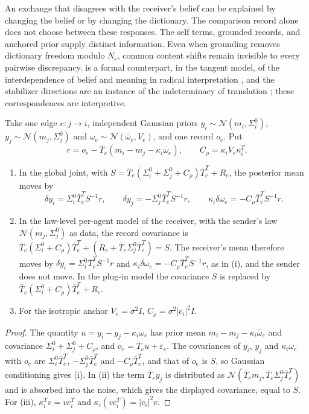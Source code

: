 An exchange that disagrees with the receiver's belief can be explained by changing the belief or by changing the dictionary. The comparison record alone does not choose between these responses. The self terms, grounded records, and anchored prior supply distinct information. Even when grounding removes dictionary freedom modulo $N_e$, common content shifts remain invisible to every pairwise discrepancy.  is a formal counterpart, in the tangent model, of the interdependence of belief and meaning in radical interpretation \citep{Davidson1973,Davidson1974}, and the stabilizer directions are an instance of the indeterminacy of translation \citep{Quine1960}; these correspondences are interpretive.

Take one edge $e:j\to i$, independent Gaussian priors $y_i\sim\mathcal N(m_i,\Sigma_i^0)$, $y_j\sim\mathcal N(m_j,\Sigma_j^0)$ and $\omega_e\sim\mathcal N(\bar\omega_e,V_e)$, and one record $o_e$. Put
\begin{equation}
r=o_e-\bar T_e(m_i-m_j-\kappa_i\bar\omega_e),\qquad C_\rho=\kappa_iV_e\kappa_i^T.
\label{it2:split-notation}
\end{equation}
\begin{enumerate}
\item[(i)] In the global joint, with $S=\bar T_e(\Sigma_i^0+\Sigma_j^0+C_\rho)\bar T_e^T+R_e$, the posterior mean moves by
\begin{equation}
\delta y_i=\Sigma_i^0\bar T_e^TS^{-1}r,\qquad
\delta y_j=-\Sigma_j^0\bar T_e^TS^{-1}r,\qquad
\kappa_i\delta\omega_e=-C_\rho\bar T_e^TS^{-1}r.
\label{it2:split-global}
\end{equation}
\item[(ii)] In the law-level per-agent model of the receiver, with the sender's law $\mathcal N(m_j,\Sigma_j^0)$ as data, the record covariance is $\bar T_e(\Sigma_i^0+C_\rho)\bar T_e^T+(R_e+\bar T_e\Sigma_j^0\bar T_e^T)=S$. The receiver's mean therefore moves by $\delta y_i=\Sigma_i^0\bar T_e^TS^{-1}r$ and $\kappa_i\delta\omega_e=-C_\rho\bar T_e^TS^{-1}r$, as in (i), and the sender does not move. In the plug-in model the covariance $S$ is replaced by $\bar T_e(\Sigma_i^0+C_\rho)\bar T_e^T+R_e$.
\item[(iii)] For the isotropic anchor $V_e=\sigma^2I$, $C_\rho=\sigma^2\vert c_i\vert^2I$.
\end{enumerate}
\begin{proof}
The quantity $u=y_i-y_j-\kappa_i\omega_e$ has prior mean $m_i-m_j-\kappa_i\bar\omega_e$ and covariance $\Sigma_i^0+\Sigma_j^0+C_\rho$, and $o_e=\bar T_eu+\varepsilon_e$. The covariances of $y_i$, $y_j$ and $\kappa_i\omega_e$ with $o_e$ are $\Sigma_i^0\bar T_e^T$, $-\Sigma_j^0\bar T_e^T$ and $-C_\rho\bar T_e^T$, and that of $o_e$ is $S$, so Gaussian conditioning gives (i). In (ii) the term $\bar T_ey_j$ is distributed as $\mathcal N(\bar T_em_j,\bar T_e\Sigma_j^0\bar T_e^T)$ and is absorbed into the noise, which gives the displayed covariance, equal to $S$. For (iii), $\kappa_i^Tv=vc_i^T$ and $\kappa_i(vc_i^T)=\vert c_i\vert^2v$.
\end{proof}

